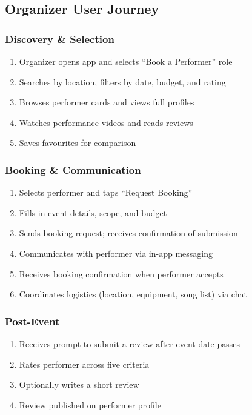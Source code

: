 \documentclass[11pt,a4paper]{article}
\begin{document}
\subsection{Organizer User Journey}

\subsubsection{Discovery \& Selection}
\begin{enumerate}[leftmargin=1.5em]
  \item Organizer opens app and selects ``Book a Performer'' role
  \item Searches by location, filters by date, budget, and rating
  \item Browses performer cards and views full profiles
  \item Watches performance videos and reads reviews
  \item Saves favourites for comparison
\end{enumerate}

\subsubsection{Booking \& Communication}
\begin{enumerate}[leftmargin=1.5em]
  \item Selects performer and taps ``Request Booking''
  \item Fills in event details, scope, and budget
  \item Sends booking request; receives confirmation of submission
  \item Communicates with performer via in-app messaging
  \item Receives booking confirmation when performer accepts
  \item Coordinates logistics (location, equipment, song list) via chat
\end{enumerate}

\subsubsection{Post-Event}
\begin{enumerate}[leftmargin=1.5em]
  \item Receives prompt to submit a review after event date passes
  \item Rates performer across five criteria
  \item Optionally writes a short review
  \item Review published on performer profile
\end{enumerate}
\end{document}
